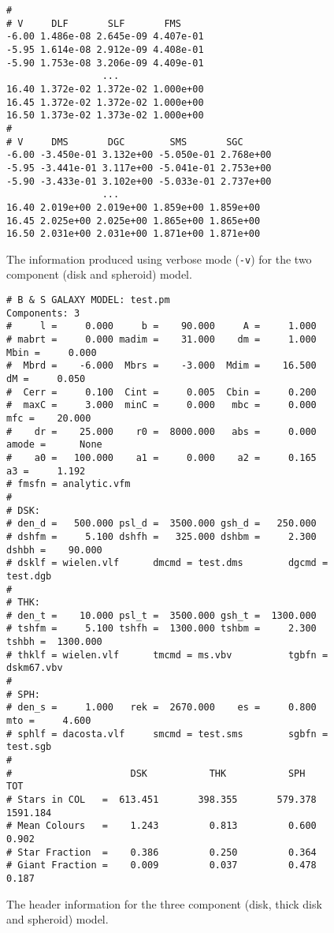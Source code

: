 \documentclass[11pt,twoside]{article}
\begin{document}
\begin{figure}[p]
\begin{center}
\begin{verbatim}
#
# V     DLF       SLF       FMS
-6.00 1.486e-08 2.645e-09 4.407e-01
-5.95 1.614e-08 2.912e-09 4.408e-01
-5.90 1.753e-08 3.206e-09 4.409e-01
                 ...
16.40 1.372e-02 1.372e-02 1.000e+00
16.45 1.372e-02 1.372e-02 1.000e+00
16.50 1.373e-02 1.373e-02 1.000e+00
#
# V     DMS       DGC        SMS       SGC
-6.00 -3.450e-01 3.132e+00 -5.050e-01 2.768e+00
-5.95 -3.441e-01 3.117e+00 -5.041e-01 2.753e+00
-5.90 -3.433e-01 3.102e+00 -5.033e-01 2.737e+00
                 ...
16.40 2.019e+00 2.019e+00 1.859e+00 1.859e+00
16.45 2.025e+00 2.025e+00 1.865e+00 1.865e+00
16.50 2.031e+00 2.031e+00 1.871e+00 1.871e+00
\end{verbatim}
\end{center}
\caption{The information produced using verbose mode ({\tt -v}) for the two
component (disk and spheroid) model.}
\end{figure}

\begin{figure}[p]
\begin{center}
\begin{verbatim}
# B & S GALAXY MODEL: test.pm                                 Components: 3 
#     l =     0.000     b =    90.000     A =     1.000
# mabrt =     0.000 madim =    31.000    dm =     1.000  Mbin =     0.000
#  Mbrd =    -6.000  Mbrs =    -3.000  Mdim =    16.500    dM =     0.050
#  Cerr =     0.100  Cint =     0.005  Cbin =     0.200
#  maxC =     3.000  minC =     0.000   mbc =     0.000   mfc =    20.000
#    dr =    25.000    r0 =  8000.000   abs =     0.000 amode =      None
#    a0 =   100.000    a1 =     0.000    a2 =     0.165    a3 =     1.192
# fmsfn = analytic.vfm            
#
# DSK:
# den_d =   500.000 psl_d =  3500.000 gsh_d =   250.000
# dshfm =     5.100 dshfh =   325.000 dshbm =     2.300 dshbh =    90.000
# dsklf = wielen.vlf      dmcmd = test.dms        dgcmd = test.dgb       
#
# THK:
# den_t =    10.000 psl_t =  3500.000 gsh_t =  1300.000
# tshfm =     5.100 tshfh =  1300.000 tshbm =     2.300 tshbh =  1300.000
# thklf = wielen.vlf      tmcmd = ms.vbv          tgbfn = dskm67.vbv     
#
# SPH:
# den_s =     1.000   rek =  2670.000    es =     0.800     mto =     4.600
# sphlf = dacosta.vlf     smcmd = test.sms        sgbfn = test.sgb       
#
#                     DSK           THK           SPH           TOT
# Stars in COL   =  613.451       398.355       579.378      1591.184
# Mean Colours   =    1.243         0.813         0.600         0.902
# Star Fraction  =    0.386         0.250         0.364
# Giant Fraction =    0.009         0.037         0.478         0.187
\end{verbatim}
\end{center}
\caption{The header information for the three component (disk, thick disk
and spheroid) model.}
\end{figure}
\end{document}
